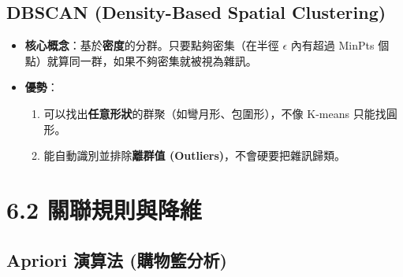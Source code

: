 \documentclass[
  letterpaper,
  DIV=11,
  numbers=noendperiod]{scrreprt}
\providecommand{\tightlist}{%
  \setlength{\itemsep}{0pt}\setlength{\parskip}{0pt}}
\begin{document}
\section{DBSCAN (Density-Based Spatial Clustering)}\label{sec-dbscan}

\begin{itemize}
\tightlist
\item
  \textbf{核心概念}：基於\textbf{密度}的分群。只要點夠密集（在半徑
  \(\epsilon\) 內有超過 MinPts
  個點）就算同一群，如果不夠密集就被視為雜訊。
\item
  \textbf{優勢}：

  \begin{enumerate}
  \def\labelenumi{\arabic{enumi}.}
  \tightlist
  \item
    可以找出\textbf{任意形狀}的群聚（如彎月形、包圍形），不像 K-means
    只能找圓形。
  \item
    能自動識別並排除\textbf{離群值 (Outliers)}，不會硬要把雜訊歸類。
  \end{enumerate}
\end{itemize}

\chapter{6.2 關聯規則與降維}\label{sec-association-rules}

\section{Apriori 演算法 (購物籃分析)}\label{sec-apriori}
\end{document}
